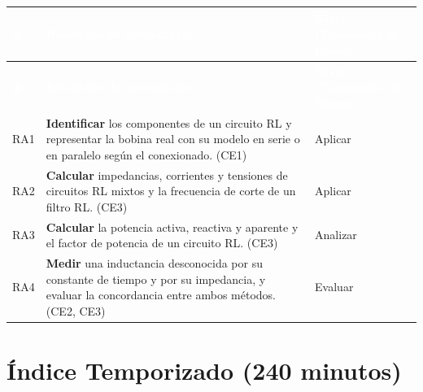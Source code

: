 \documentclass[11pt,letterpaper]{article}
\begin{document}
\begin{xltabular}{\linewidth}{>{\raggedright\arraybackslash}p{1.1cm}>{\raggedright\arraybackslash}X>{\raggedright\arraybackslash}p{3.9cm}}
 \textcolor{white}{\textbf{\#}} & \textcolor{white}{\textbf{Resultado de aprendizaje}} & \textcolor{white}{\textbf{Nivel (Taxonomía de Bloom)}} \\
\endfirsthead
{} \textcolor{white}{\textbf{\#}} & \textcolor{white}{\textbf{Resultado de aprendizaje}} & \textcolor{white}{\textbf{Nivel (Taxonomía de Bloom)}} \\
\endhead
\bottomrule
\endlastfoot
  RA1 & \textbf{Identificar} los componentes de un circuito RL y representar la bobina real con su modelo en serie o en paralelo según el conexionado. (CE1) & Aplicar \\
   RA2 & \textbf{Calcular} impedancias, corrientes y tensiones de circuitos RL mixtos y la frecuencia de corte de un filtro RL. (CE3) & Aplicar \\
  RA3 & \textbf{Calcular} la potencia activa, reactiva y aparente y el factor de potencia de un circuito RL. (CE3) & Analizar \\
   RA4 & \textbf{Medir} una inductancia desconocida por su constante de tiempo y por su impedancia, y evaluar la concordancia entre ambos métodos. (CE2, CE3) & Evaluar \\
\end{xltabular}

\section{Índice Temporizado (240 minutos)}
\end{document}
